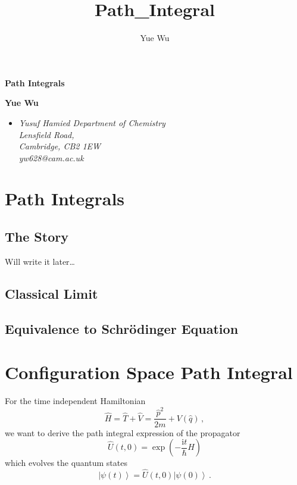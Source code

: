 \documentclass{article}
\title{Path_Integral}
\author{Yue Wu}
\theoremstyle{plain}\theoremheaderfont{\normalfont\itshape}\theorembodyfont{\rmfamily}\theoremseparator{.}\newtheorem*{rem}{Remark}\newtheorem*{ex}{Example}\newtheorem*{proof}{Proof}\newtheorem*{altp}{Alternative proof}
\theoremstyle{plain}\theoremheaderfont{\normalfont\bfseries}\theorembodyfont{\rmfamily}\theoremseparator{.}\newtheorem{thm}{Theorem}[section]\newtheorem{lem}[thm]{Lemma}\newtheorem{prop}[thm]{Proposition}\newtheorem*{cor}{Corollary}\newtheorem{defn}[thm]{Definition}\newtheorem{clm}[thm]{Claim}\newtheorem{clminproof}{Claim}
\theoremstyle{break}\theoremheaderfont{\normalfont\itshape}\theorembodyfont{\rmfamily}\theoremseparator{.\medskip}\newtheorem*{proofskip}{Proof}\newtheorem*{exs}{Examples}\newtheorem*{rems}{Remarks}
\theoremstyle{break}\theoremheaderfont{\normalfont\bfseries}\theorembodyfont{\rmfamily}\theoremseparator{.\medskip}\newtheorem{lemskip}[thm]{Lemma}\newtheorem{defnskip}[thm]{Definition}\newtheorem{propskip}[thm]{Proposition}\newtheorem{thmskip}[thm]{Theorem}
\numberwithin{equation}{section}
\newcommand{\ii}{\mathrm{i}}
\newcommand{\ket}[1]{\left| #1 \right\rangle}
\begin{document}
    \setlength{\parindent}{0pt}
	\Huge\textsf{\textbf{Path Integrals}}

	\noindent\makebox[\linewidth]{\rule{\textwidth}{2pt}}

	\large\textsf{\textbf{Yue Wu}}
	\begin{itemize}[topsep=0pt,leftmargin=15pt]
		\item[] \textit{Yusuf Hamied Department of Chemistry\\
		Lensfield Road,\\
		Cambridge, CB2 1EW}\\

		\textit{yw628@cam.ac.uk}
	\end{itemize}
    \thispagestyle{empty}
    \setlength{\parindent}{15pt}

    \normalsize
	\newpage
	\tableofcontents
	\newpage

    \section{Path Integrals}

    \subsection{The Story}
    Will write it later\dots

    \subsection{Classical Limit}

    \subsection{Equivalence to Schr\"{o}dinger Equation}

    \newpage

    \section{Configuration Space Path Integral}
    For the time independent Hamiltonian
    \begin{equation}
        \hat{H}=\hat{T}+\hat{V}=\frac{\hat{p}^2}{2m}+V(\hat{q})\,,
    \end{equation}
    we want to derive the path integral expression of the propagator
    \begin{equation}
        \hat{U}(t,0)=\exp\left(-\frac{\ii t}{\hbar}\hat{H}\right)
    \end{equation}
    which evolves the quantum states
    \begin{equation}
        \ket{\psi(t)}=\hat{U}(t,0)\ket{\psi(0)}\,.
    \end{equation}
\end{document}
